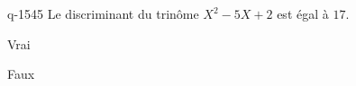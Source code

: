 \begin{truefalse}{q-1545}
Le discriminant du trinôme $X^2-5X+2$ est égal à $17$.
\item* Vrai
\item Faux
\end{truefalse}

